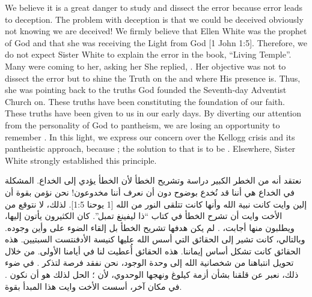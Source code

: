 We believe it is a great danger to study and dissect the error because error leads to deception. The problem with deception is that we could be deceived obviously not knowing we are deceived! We firmly believe that Ellen White was the prophet of God and that she was receiving the Light from God [1 John 1:5]. Therefore, we do not expect Sister White to explain the error in the book, “Living Temple”. Many were coming to her, asking her  She replied, . Her objective was not to dissect the error but to shine the Truth on the  and where His presence is. Thus, she was pointing back to the truths God founded the Seventh-day Adventist Church on. These truths have been constituting the foundation of our faith. These truths have been given to us in our early days. By diverting our attention from the personality of God to pantheism, we are losing an opportunity to remember . In this light, we express our concern over the Kellogg crisis and its pantheistic approach, because ; the solution to that is to be . Elsewhere, Sister White strongly established this principle.


نعتقد أنه من الخطر الكبير دراسة وتشريح الخطأ لأن الخطأ يؤدي إلى الخداع. المشكلة في الخداع هي أننا قد نُخدع بوضوح دون أن نعرف أننا مخدوعون! نحن نؤمن بقوة أن إلين وايت كانت نبية الله وأنها كانت تتلقى النور من الله [1 يوحنا 1:5]. لذلك، لا نتوقع من الأخت وايت أن تشرح الخطأ في كتاب “ذا ليفينغ تمبل”. كان الكثيرون يأتون إليها، ويطلبون منها  أجابت، . لم يكن هدفها تشريح الخطأ بل إلقاء الضوء على  وأين وجوده. وبالتالي، كانت تشير إلى الحقائق التي أسس الله عليها كنيسة الأدفنتست السبتيين. هذه الحقائق كانت تشكل أساس إيماننا. هذه الحقائق أُعطيت لنا في أيامنا الأولى. من خلال تحويل انتباهنا من شخصانية الله إلى وحدة الوجود، نحن نفقد فرصة لتذكر . في ضوء ذلك، نعبر عن قلقنا بشأن أزمة كيلوغ ونهجها الوحدوي، لأن ؛ الحل لذلك هو أن نكون . في مكان آخر، أسست الأخت وايت هذا المبدأ بقوة.


